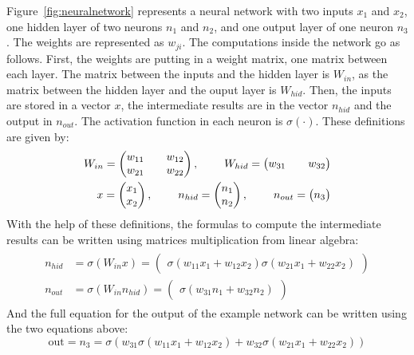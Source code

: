 Figure~\ref{fig:neuralnetwork} represents a neural network with two inputs $x_1$ and $x_2$, one hidden layer of two neurons $n_1$ and $n_2$, and one output layer of one neuron $n_3$. The weights are represented as $w_{ji}$. The computations inside the network go as follows. First, the weights are putting in a weight matrix, one matrix between each layer. The matrix between the inputs and the hidden layer is $W_{in}$, as the matrix between the hidden layer and the ouput layer is $W_{hid}$. Then, the inputs are stored in a vector $x$, the intermediate results are in the vector $n_{hid}$ and the output in $n_{out}$. The activation function in each neuron is $\sigma(\cdot)$. These definitions are given by:
\begin{align}
  \begin{split}
    W_{in} = \begin{pmatrix}
      w_{11} && w_{12}\\
      w_{21} && w_{22}
    \end{pmatrix}, \hspace{0.8cm}
    W_{hid} = \begin{pmatrix}
      w_{31} && w_{32}
    \end{pmatrix} \\
    x = \begin{pmatrix}
      x_1\\ x_2
    \end{pmatrix}, \hspace{0.8cm}
    n_{hid} = \begin{pmatrix}
      n_1\\ n_2
    \end{pmatrix}, \hspace{0.8cm}
    n_{out} = \begin{pmatrix}
      n_3
    \end{pmatrix}
  \end{split}
\end{align}
With the help of these definitions, the formulas to compute the intermediate results can be written using matrices multiplication from linear algebra:
\begin{align}
  \begin{split}
    n_{hid} &= \sigma(W_{in}x) = \begin{pmatrix}
      \sigma(w_{11} x_1 + w_{12} x_2)
      \sigma(w_{21} x_1 + w_{22} x_2)
    \end{pmatrix} \\
    n_{out} &= \sigma(W_{in} n_{hid}) = \begin{pmatrix}
      \sigma(w_{31} n_1 + w_{32} n_2)
    \end{pmatrix}
  \end{split}
\end{align}
And the full equation for the output of the example network can be written using the two equations above:
\begin{equation}
  \text{out} = n_3 = \sigma(w_{31} \sigma(w_{11} x_1 + w_{12} x_2) + w_{32} \sigma(w_{21} x_1 + w_{22} x_2))
\end{equation}

